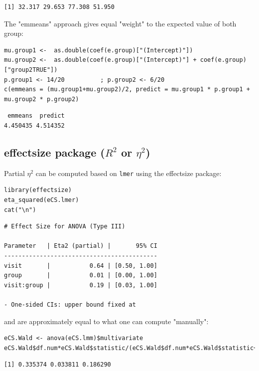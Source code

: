 \documentclass[12pt]{article}
\begin{document}
\begin{verbatim}
[1] 32.317 29.653 77.308 51.950
\end{verbatim}


The "emmeans" approach gives equal "weight" to the expected value of
both group:
\lstset{language=r,label= ,caption= ,captionpos=b,numbers=none}
\begin{lstlisting}
mu.group1 <-  as.double(coef(e.group)["(Intercept)"])
mu.group2 <-  as.double(coef(e.group)["(Intercept)"] + coef(e.group)["group2TRUE"])
p.group1 <- 14/20          ; p.group2 <- 6/20
c(emmeans = (mu.group1+mu.group2)/2, predict = mu.group1 * p.group1 + mu.group2 * p.group2)
\end{lstlisting}

\begin{verbatim}
 emmeans  predict 
4.450435 4.514352
\end{verbatim}


\clearpage

\subsection{effectsize package (\(R^2\) or \(\eta^2\))}
\label{sec:org682f7fe}

Partial \(\eta^2\) can be computed based on \texttt{lmer} using the effectsize package:
\lstset{language=r,label= ,caption= ,captionpos=b,numbers=none}
\begin{lstlisting}
library(effectsize)
eta_squared(eCS.lmer)
cat("\n")
\end{lstlisting}

\begin{verbatim}
# Effect Size for ANOVA (Type III)

Parameter   | Eta2 (partial) |       95% CI
-------------------------------------------
visit       |           0.64 | [0.50, 1.00]
group       |           0.01 | [0.00, 1.00]
visit:group |           0.19 | [0.03, 1.00]

- One-sided CIs: upper bound fixed at
\end{verbatim}


and are approximately equal to what one can compute "manually":
\lstset{language=r,label= ,caption= ,captionpos=b,numbers=none}
\begin{lstlisting}
eCS.Wald <- anova(eCS.lmm)$multivariate
eCS.Wald$df.num*eCS.Wald$statistic/(eCS.Wald$df.num*eCS.Wald$statistic+eCS.Wald$df.denom)
\end{lstlisting}

\begin{verbatim}
[1] 0.335374 0.033811 0.186290
\end{verbatim}
\end{document}
